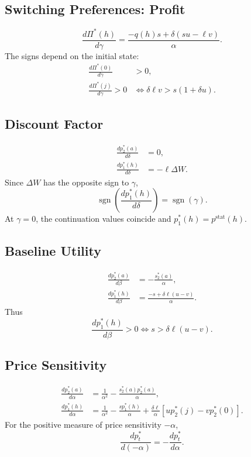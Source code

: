 \documentclass[12pt]{article}
\theoremstyle{definition}
\theoremstyle{remark}
\begin{document}
\subsection{Switching Preferences: Profit}
\begin{equation}
 \frac{d\Pi^*(h)}{d\gamma}
 =\frac{-q(h)s+\delta(su-\ell v)}{\alpha}.
 \label{eq:supply-gamma-profit}
\end{equation}
The signs depend on the initial state:
\begin{align}
 \frac{d\Pi^*(0)}{d\gamma}&>0,\\
 \frac{d\Pi^*(j)}{d\gamma}>0
 &\iff\delta\ell v>s(1+\delta u).
\end{align}

\subsection{Discount Factor}
\begin{align}
 \frac{dp_2^*(a)}{d\delta}&=0,\\
 \frac{dp_1^*(h)}{d\delta}&=-\ell\Delta W.
\end{align}
Since $\Delta W$ has the opposite sign to $\gamma$,
\begin{equation}
 \operatorname{sgn}\!\left(\frac{dp_1^*(h)}{d\delta}\right)
 =\operatorname{sgn}(\gamma).
\end{equation}
At $\gamma=0$, the continuation values coincide and
$p_1^*(h)=p^{\mathrm{stat}}(h)$.

\subsection{Baseline Utility}
\begin{align}
 \frac{dp_2^*(a)}{d\beta}&=-\frac{s_2^*(a)}{\alpha},\\
 \frac{dp_1^*(h)}{d\beta}&=\frac{-s+\delta\ell(u-v)}{\alpha}.
\end{align}
Thus
\begin{equation}
 \frac{dp_1^*(h)}{d\beta}>0\iff s>\delta\ell(u-v).
\end{equation}

\subsection{Price Sensitivity}
\begin{align}
 \frac{dp_2^*(a)}{d\alpha}&=\frac{1}{\alpha^2}
 -\frac{s_2^*(a)p_2^*(a)}{\alpha},\\
 \frac{dp_1^*(h)}{d\alpha}&=\frac{1}{\alpha^2}
 -\frac{sp_1^*(h)}{\alpha}
 +\frac{\delta\ell}{\alpha}[up_2^*(j)-vp_2^*(0)].
\end{align}
For the positive measure of price sensitivity $-\alpha$,
\begin{equation}
 \frac{dp_t^*}{d(-\alpha)}=-\frac{dp_t^*}{d\alpha}.
\end{equation}
\end{document}

